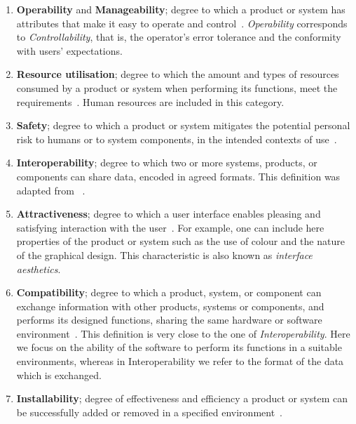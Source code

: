 \begin{enumerate}
    \item \textbf{Operability} and \textbf{Manageability}; degree to which a product or system has attributes that make it easy to operate and control~\cite{iso_25010_2011_2017}. \textit{Operability} corresponds to \textit{Controllability}, that is, the operator's error tolerance and the conformity with users' expectations.

    \item \textbf{Resource utilisation}; degree to which the amount and types of resources consumed by a product or system when performing its functions, meet the requirements~\cite{iso_25010_2011_2017}. Human resources are included in this category.

    \item \textbf{Safety}; degree to which a product or system mitigates the potential personal risk to humans or to system components, in the intended contexts of use~\cite{iso_25010_2011_2017}.

    \item \textbf{Interoperability}; degree to which two or more systems, products, or components can share data, encoded in agreed formats. This definition was adapted from ~\cite{iso_iec_24765_2017}.

    \item \textbf{Attractiveness}; degree to which a user interface enables pleasing and satisfying interaction with the user~\cite{iso_25010_2011_2017}. For example, one can include here properties of the product or system such as the use of colour and the nature of the graphical design. This characteristic is also known as \textit{interface aesthetics}.

    \item \textbf{Compatibility}; degree to which a product, system, or component can exchange information with other products, systems or components, and performs its designed functions, sharing the same hardware or software environment~\cite{iso_25010_2011_2017}. This definition is very close to the one of \textit{Interoperability}. Here we focus on the ability of the software to perform its functions in a suitable environments, whereas in Interoperability we refer to the format of the data which is exchanged.

    \item \textbf{Installability}; degree of effectiveness and efficiency a product or system can be successfully added or removed in a specified environment~\cite{iso_25010_2011_2017}.


\end{enumerate}
